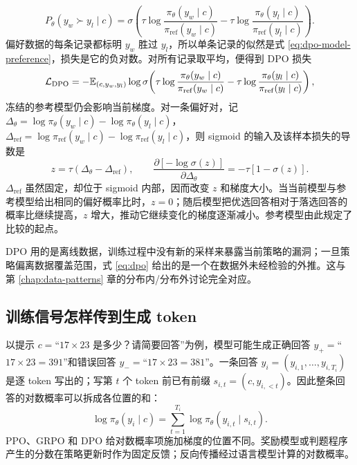 \begin{equation}
 P_\theta(y_w\succ y_l\mid c)
 =\sigma\!\left(
 \tau\log\frac{\pi_\theta(y_w\mid c)}{\pi_{\mathrm{ref}}(y_w\mid c)}
 -\tau\log\frac{\pi_\theta(y_l\mid c)}{\pi_{\mathrm{ref}}(y_l\mid c)}
 \right).\label{eq:dpo-model-preference}
\end{equation}
偏好数据的每条记录都标明 \(y_w\) 胜过 \(y_l\)，所以单条记录的似然是式 \eqref{eq:dpo-model-preference}，损失是它的负对数。对所有记录取平均，便得到 DPO 损失
\begin{equation}
 \mathcal L_{\mathrm{DPO}}
 =-\mathbb{E}_{(c,y_w,y_l)}\log\sigma\!\left(
 \tau\log\frac{\pi_\theta(y_w\mid c)}{\pi_{\mathrm{ref}}(y_w\mid c)}
 -\tau\log\frac{\pi_\theta(y_l\mid c)}{\pi_{\mathrm{ref}}(y_l\mid c)}
 \right),\label{eq:dpo}
\end{equation}
冻结的参考模型仍会影响当前梯度。对一条偏好对，记 \(\Delta_\theta=\log\pi_\theta(y_w\mid c)-\log\pi_\theta(y_l\mid c)\)，\(\Delta_{\mathrm{ref}}=\log\pi_{\mathrm{ref}}(y_w\mid c)-\log\pi_{\mathrm{ref}}(y_l\mid c)\)，则 sigmoid 的输入及该样本损失的导数是
\begin{equation}
 z=\tau(\Delta_\theta-\Delta_{\mathrm{ref}}),\qquad
 \frac{\partial[-\log\sigma(z)]}{\partial\Delta_\theta}
   =-\tau[1-\sigma(z)].
\end{equation}
\(\Delta_{\mathrm{ref}}\) 虽然固定，却位于 sigmoid 内部，因而改变 \(z\) 和梯度大小。当当前模型与参考模型给出相同的偏好概率比时，\(z=0\)；随后模型把优选回答相对于落选回答的概率比继续提高，\(z\) 增大，推动它继续变化的梯度逐渐减小。参考模型由此规定了比较的起点。

DPO 用的是离线数据，训练过程中没有新的采样来暴露当前策略的漏洞；一旦策略偏离数据覆盖范围，式 \eqref{eq:dpo} 给出的是一个在数据外未经检验的外推。这与第 \ref{chap:data-patterns} 章的分布内/分布外讨论完全对应。

\subsection{训练信号怎样传到生成 token}

以提示 \(c=\)“\(17\times23\) 是多少？请简要回答”为例，模型可能生成正确回答 \(y_+=\)“\(17\times23=391\)”和错误回答 \(y_-=\)“\(17\times23=381\)”。一条回答 \(y_i=(y_{i,1},\ldots,y_{i,T_i})\) 是逐 token 写出的；写第 \(t\) 个 token 前已有前缀 \(s_{i,t}=(c,y_{i,<t})\)。因此整条回答的对数概率可以拆成各位置的和：
\begin{equation}
 \log\pi_\theta(y_i\mid c)=\sum_{t=1}^{T_i}\log\pi_\theta(y_{i,t}\mid s_{i,t}).
\end{equation}
PPO、GRPO 和 DPO 给对数概率项施加梯度的位置不同。奖励模型或判题程序产生的分数在策略更新时作为固定反馈；反向传播经过语言模型计算的对数概率。

